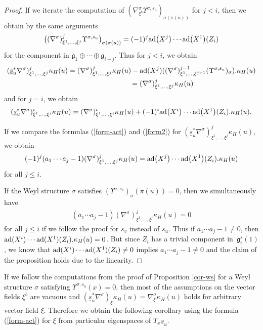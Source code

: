 \documentclass[pdftex]{sigma}
\newcommand{\ka}{\kappa}
\newcommand{\si}{\sigma}
\newcommand{\un}{\underline}
\newcommand{\fg}{\mathfrak g}
\newcommand{\na}{\nabla}
\newcommand{\U}{\Upsilon}
\newcommand{\ad}{{\rm ad}}
\numberwithin{equation}{section}
\begin{document}
\begin{proof}
If we iterate the computation of $(\na^\si_{\xi^b} \U^{\si,s_u})_{\si(\pi(u))}$ for $j<i$, then we obtain by the same arguments
\begin{gather*}\big((\nabla^\si)^j_{\xi^1,\dots,\xi^j} \U^{\si,s_u}\big)_{\si(\pi(u))}=(-1)^j\ad\big(X^j\big)\cdots \ad\big(X^1\big)(Z_i)\end{gather*}
for the component in $\fg_1\oplus \cdots \oplus \fg_{i-j}$. Thus for $j<i$, we obtain
\begin{gather*}
(\un s_u^*\nabla^\si)^j_{\xi^1,\dots,\xi^j} \ka_H(u) =(\nabla^\si)^{j}_{\xi^1,\dots,\xi^{j}} \ka_H(u)-\ad(X^{j})((\nabla^\si)^{j-1}_{\xi^1,\dots,\xi^{j-1}}(\U^{\si,s_u})_\si).\ka_H(u)\\
\hphantom{(\un s_u^*\nabla^\si)^j_{\xi^1,\dots,\xi^j} \ka_H(u)}{}
=(\nabla^\si)^{j}_{\xi^1,\dots,\xi^{j}} \ka_H(u)
\end{gather*}
and for $j=i$, we obtain
\begin{gather} \label{form2}
(\un s_u^*\nabla^\si)^i_{\xi^1,\dots,\xi^i} \ka_H(u)=(\nabla^\si)^i_{\xi^1,\dots,\xi^i} \ka_H(u)+(-1)^i\ad\big(X^i\big)\cdots \ad\big(X^1\big)(Z_i).\kappa_H(u).
\end{gather}

If we compare the formulas (\ref{form-act}) and (\ref{form2}) for $(\un s_u^*\nabla^\si)^j_{\xi^1,\dots,\xi^j} \ka_H(u)$, we obtain
\begin{gather}\label{gl--zavorka}
(-1)^j(a_1\cdots a_j-1)(\nabla^\si)^j_{\xi^1,\dots,\xi^j} \ka_H(u) =\ad\big(X^j\big)\cdots \ad\big(X^1\big)(Z_i).\kappa_H(u)
\end{gather}
for all $j\leq i.$

If the Weyl structure $\si$ satisf\/ies $(\U^{\si,s_v})_\si(\pi(u))=0$, then we simultaneously have
\begin{gather*}(a_1\cdots a_j-1)(\nabla^\si)^j_{\xi^1,\dots,\xi^j} \ka_H(u)=0\end{gather*}
for all $j\leq i$ if we follow the proof for $s_v$ instead of $s_u$. Thus if $a_1\cdots a_j-1\neq 0$, then $\ad(X^i)\cdots \ad(X^1)(Z_i).\kappa_H(u)=0$. But since $Z_i$ has a trivial component in~$\fg_i^s(1)$, we know that $\ad(X^i)\cdots \ad(X^1)(Z_i)\neq 0$ implies $a_1\cdots a_j-1\neq 0$ and the claim of the proposition holds due to the linearity.
\end{proof}

If we follow the computations from the proof of Proposition \ref{cor-ws} for a Weyl structure $\si$ satisfying $\U^{\si,s_u}(x)=0$, then most of the assumptions on the vector f\/ields $\xi^b$ are vacuous and $(\un s_u^*\nabla^\si)_{\xi} \ka_H(u)=\nabla^{\si}_{\xi} \ka_H(u)$ holds for arbitrary vector f\/ield $\xi$. Therefore we obtain the following corollary using the formula (\ref{form-act}) for $\xi$ from particular eigenspaces of $T_x\un s_u$.
\end{document}
